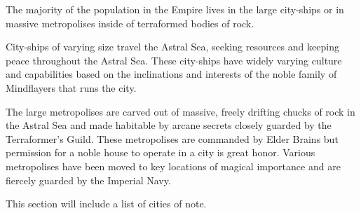 The majority of the population in the Empire lives in the large city-ships or in massive metropolises inside of terraformed bodies of rock.

City-ships of varying size travel the Astral Sea, seeking resources and keeping peace throughout the Astral Sea.
These city-ships have widely varying culture and capabilities based on the inclinations and interests of the noble family of Mindflayers that runs the city.

The large metropolises are carved out of massive, freely drifting chucks of rock in the Astral Sea and made habitable by arcane secrets closely guarded by the Terraformer's Guild.
These metropolises are commanded by Elder Brains but permission for a noble house to operate in a city is great honor.
Various metropolises have been moved to key locations of magical importance and are fiercely guarded by the Imperial Navy.

This section will include a list of cities of note.
